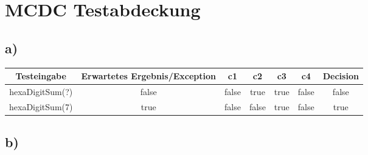 \chapter{MCDC Testabdeckung}
\section{a)}
\begin{center}
	\begin{tabular}{ c c c c c c c }
		\hline
		Testeingabe & Erwartetes Ergebnis/Exception & c1 & c2 & c3 & c4 & Decision  \\
		\hline 
		 hexaDigitSum(?)& false & false & true & true & false & false  \\  
		 hexaDigitSum(7)& true & false & false & true & false & true  
	\end{tabular}
\end{center}

\section{b)}


